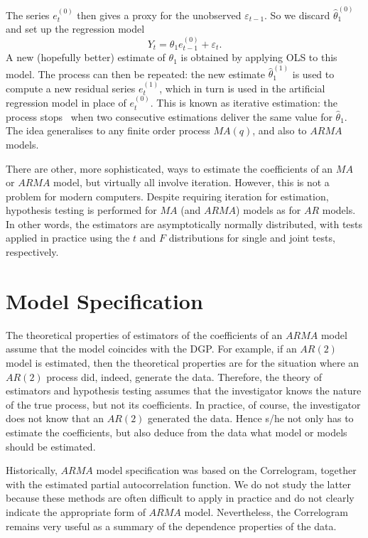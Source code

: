 \documentclass[openany]{tufte-book} %
\begin{document}
The series $e_{t}^{(0)}$ then gives a proxy for the unobserved $\varepsilon
_{t-1}$. So we discard $\widehat{\theta }_{1}^{(0)}$ and set up the
regression model
\begin{equation}
Y_{t}=\theta _{1}e_{t-1}^{(0)}+\varepsilon _{t}.  \label{MA1 regression}
\end{equation}%
A new (hopefully better) estimate of $\theta _{1}$ is obtained by applying
OLS to this model. The process can then be repeated: the new estimate $%
\widehat{\theta }_{1}^{(1)}$ is used to compute a new residual series $%
e_{t}^{(1)}$, which in turn is used in the artificial regression model in
place of $e_{t}^{(0)}$. This is known as iterative estimation: the process
stops \ when two consecutive estimations deliver the same value for $%
\widehat{\theta }_{1}$. The idea generalises to any finite order process $%
MA(q)$, and also to $ARMA$ models.

There are other, more sophisticated, ways to estimate the coefficients of an
$MA$ or $ARMA$ model, but virtually all involve iteration. However, this is
not a problem for modern computers. Despite requiring iteration for
estimation, hypothesis testing is performed for $MA$ (and $ARMA$) models as
for $AR$ models. In other words, the estimators are asymptotically normally
distributed, with tests applied in practice using the $t$ and $F$
distributions for single and joint tests, respectively.


\section{Model Specification}

The theoretical properties of estimators of the coefficients of an $ARMA$
model assume that the model coincides with the DGP. For example, if an $%
AR(2) $ model is estimated, then the theoretical properties are for the
situation where an $AR(2)$ process did, indeed, generate the data.
Therefore, the theory of estimators and hypothesis testing assumes that the
investigator knows the nature of the true process, but not its coefficients.
In practice, of course, the investigator does not know that an $AR(2)$
generated the data. Hence s/he not only has to estimate the coefficients,
but also deduce from the data what model or models should be estimated.

Historically, $ARMA$ model specification was based on the Correlogram,
together with the estimated partial autocorrelation function. We do not
study the latter because these methods are often difficult to apply in
practice and do not clearly indicate the appropriate form of $ARMA$ model.
Nevertheless, the Correlogram remains very useful as a summary of the
dependence properties of the data.
\end{document}
